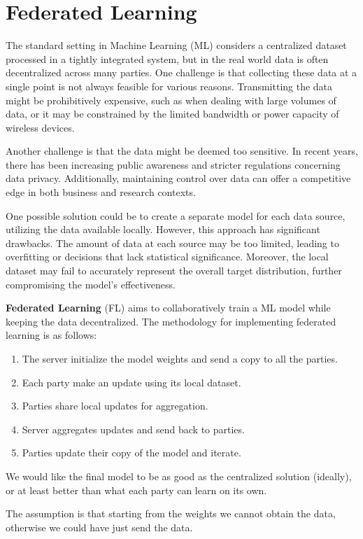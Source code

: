 \chapter{Federated Learning}
The standard setting in Machine Learning (ML) considers a centralized dataset processed in a tightly integrated system,
but in the real world data is often decentralized across many parties. One challenge is that collecting these data at a
single point is not always feasible for various reasons. Transmitting the data might be prohibitively expensive, such 
as when dealing with large volumes of data, or it may be constrained by the limited bandwidth or power capacity of 
wireless devices.

Another challenge is that the data might be deemed too sensitive. In recent years, there has been increasing public
awareness and stricter regulations concerning data privacy. Additionally, maintaining control over data can offer a
competitive edge in both business and research contexts.

One possible solution could be to create a separate model for each data source, utilizing the data available locally.
However, this approach has significant drawbacks. The amount of data at each source may be too limited, leading to 
overfitting or decisions that lack statistical significance. Moreover, the local dataset may fail to accurately represent
the overall target distribution, further compromising the model's effectiveness.

\textbf{Federated Learning} (FL) aims to collaboratively train a ML model while keeping the data decentralized. The 
methodology for implementing federated learning is as follows:
\begin{enumerate}
    \item The server initialize the model weights and send a copy to all the parties.
    \item Each party make an update using its local dataset.
    \item Parties share local updates for aggregation.
    \item Server aggregates updates and send back to parties.
    \item Parties update their copy of the model and iterate.
\end{enumerate}

We would like the final model to be as good as the centralized solution (ideally), or at least better 
than what each party can learn on its own.

\begin{note}
    The assumption is that starting from the weights we cannot obtain the data, otherwise we could have just send the
    data.
\end{note}
